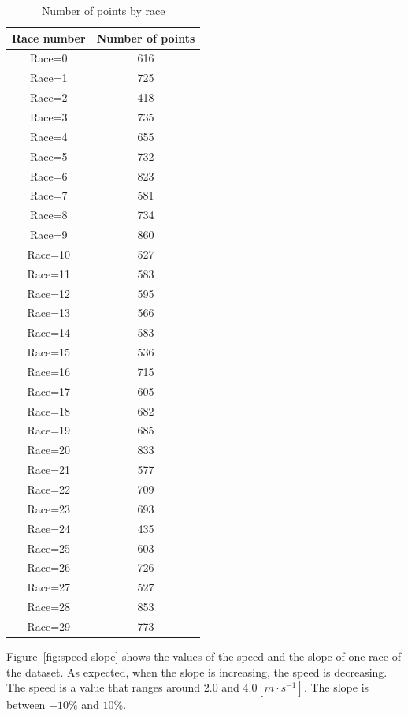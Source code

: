 \documentclass[a4paper, 10pt, conference]{ieeeconf}      %
\begin{document}
\begin{table}[thpb]
  \begin{center}
    \begin{tabular}{|c||c|}
    \hline
    \textbf{Race number} & \textbf{Number of points}\\
    \hline
    \hline
    Race=0 & 616\\
    Race=1 & 725\\
    Race=2 & 418\\
    Race=3 & 735\\
    Race=4 & 655\\
    Race=5 & 732\\
    Race=6 & 823\\
    Race=7 & 581\\
    Race=8 & 734\\
    Race=9 & 860\\
    Race=10 & 527\\
    Race=11 & 583\\
    Race=12 & 595\\
    Race=13 & 566\\
    Race=14 & 583\\
    Race=15 & 536\\
    Race=16 & 715\\
    Race=17 & 605\\
    Race=18 & 682\\
    Race=19 & 685\\
    Race=20 & 833\\
    Race=21 & 577\\
    Race=22 & 709\\
    Race=23 & 693\\
    Race=24 & 435\\
    Race=25 & 603\\
    Race=26 & 726\\
    Race=27 & 527\\
    Race=28 & 853\\
    Race=29 & 773\\
    \hline
    \end{tabular}
  \end{center}
  \caption{Number of points by race}
  \label{tbl:data-source}
\end{table}

Figure~\ref{fig:speed-slope} shows the values of the speed and the slope of one race of the dataset. As expected, when the slope is increasing, the speed is decreasing. The speed is a value that ranges around $2.0$ and $4.0 [m \cdot s^{-1}]$. The slope is between $-10\%$ and $10\%$.
\end{document}
